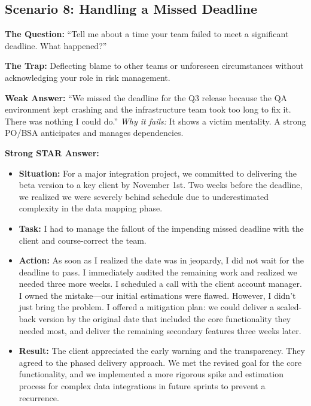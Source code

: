 \subsection{Scenario 8: Handling a Missed
Deadline}\label{scenario-8-handling-a-missed-deadline}

\textbf{The Question:} ``Tell me about a time your team failed to meet a
significant deadline. What happened?''

\textbf{The Trap:} Deflecting blame to other teams or unforeseen
circumstances without acknowledging your role in risk management.

\textbf{Weak Answer:} ``We missed the deadline for the Q3 release
because the QA environment kept crashing and the infrastructure team
took too long to fix it. There was nothing I could do.'' \emph{Why it
fails:} It shows a victim mentality. A strong PO/BSA anticipates and
manages dependencies.

\textbf{Strong STAR Answer:}

\begin{itemize}
\tightlist
\item
  \textbf{Situation:} For a major integration project, we committed to
  delivering the beta version to a key client by November 1st. Two weeks
  before the deadline, we realized we were severely behind schedule due
  to underestimated complexity in the data mapping phase.
\item
  \textbf{Task:} I had to manage the fallout of the impending missed
  deadline with the client and course-correct the team.
\item
  \textbf{Action:} As soon as I realized the date was in jeopardy, I did
  not wait for the deadline to pass. I immediately audited the remaining
  work and realized we needed three more weeks. I scheduled a call with
  the client account manager. I owned the mistake---our initial
  estimations were flawed. However, I didn't just bring the problem. I
  offered a mitigation plan: we could deliver a scaled-back version by
  the original date that included the core functionality they needed
  most, and deliver the remaining secondary features three weeks later.
\item
  \textbf{Result:} The client appreciated the early warning and the
  transparency. They agreed to the phased delivery approach. We met the
  revised goal for the core functionality, and we implemented a more
  rigorous spike and estimation process for complex data integrations in
  future sprints to prevent a recurrence.
\end{itemize}

